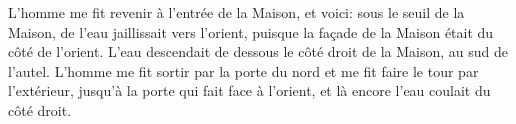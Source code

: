 L’homme me fit revenir à l’entrée de la Maison, et voici:
	sous le seuil de la Maison, de l’eau jaillissait vers l’orient,
	puisque la façade de la Maison était du côté de l’orient.
L’eau descendait de dessous le côté droit de la Maison, au sud de l’autel.
L’homme me fit sortir par la porte du nord et me fit faire le tour par l’extérieur,
	jusqu’à la porte qui fait face à l’orient, et là encore l’eau coulait du côté droit.
